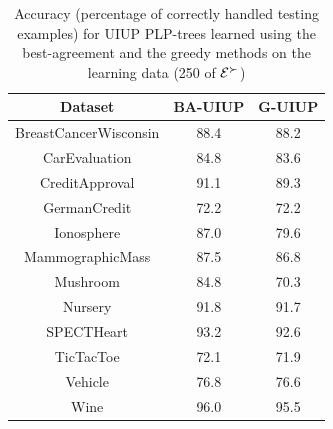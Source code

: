 \begin{table}
  \centering
  \small
  \begin{tabular}{ |c||c|c| }
    \hline
    Dataset          & BA-UIUP & G-UIUP \\
    \hline \hline                               
    BreastCancerWisconsin              & 88.4   & 88.2     \\ \hline
    CarEvaluation               & 84.8   & 83.6     \\ \hline
    CreditApproval               & 91.1   & 89.3     \\ \hline
    GermanCredit               & 72.2   & 72.2     \\ \hline
    Ionosphere               & 87.0   & 79.6     \\ \hline
    MammographicMass               & 87.5   & 86.8     \\ \hline
    Mushroom               & 84.8   & 70.3     \\ \hline
    Nursery               & 91.8   & 91.7     \\ \hline
    SPECTHeart               & 93.2   & 92.6     \\ \hline
    TicTacToe              & 72.1   & 71.9     \\ \hline
    Vehicle               & 76.8   & 76.6     \\ \hline
    Wine               & 96.0   & 95.5     \\ \hline
  \end{tabular}
  \caption{Accuracy (percentage of correctly handled testing examples)
					 for UIUP PLP-trees learned using the best-agreement and
					 the greedy methods on the learning 
					 data (250 of $\mathcal{E}^\succ$)}
  \label{tbl:trees1}
\end{table}

%
%

